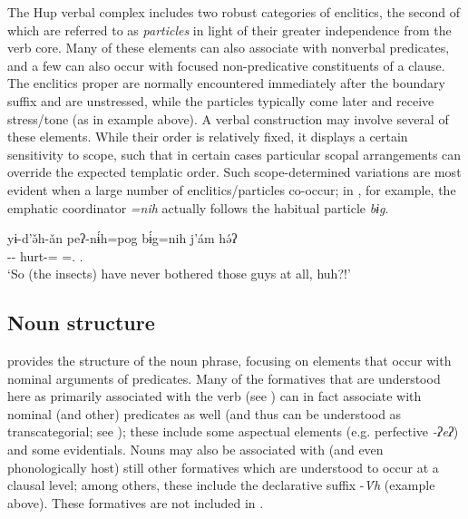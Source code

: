 \documentclass[output=paper]{langscibook}
\begin{document}
The Hup verbal complex includes two robust categories of enclitics, the second of which are referred to as \textit{particles} in light of their greater independence from the verb core. Many of these elements can also associate with nonverbal predicates, and a few can also occur with focused non-predicative constituents of a clause. The enclitics proper are normally encountered immediately after the boundary suffix and are unstressed, while the particles typically come later and receive stress/tone (as in example  above). A verbal construction may involve several of these elements. While their order is relatively fixed, it displays a certain sensitivity to scope, such that in certain cases particular scopal arrangements can override the expected templatic order. Such scope-determined variations are most evident when a large number of enclitics/particles co-occur; in , for example, the emphatic coordinator \textit{=nih} actually follows the habitual particle \textit{bɨg}.

\ea\label{ex:hup:key:9} 
\gll yɨ-d'ǝ̌h-ǎn peʔ-nɨ́h=pog bɨ́g=nih j'ám hǝ́ʔ\\ 
\Dem-\Pl-\Obj{} hurt-\Neg{}=\Emph{} \Hab=\Emph.\Co{} \Dst.\Cntr{} \Tag{} \\ 
\glt `So (the insects) have never bothered those guys at all, huh?!'
\z 


\subsection{Noun structure} 
\label{sec:hup:key:3.2}

 provides the structure of the noun phrase, focusing on elements that occur with nominal arguments of predicates. Many of the formatives that are understood here as primarily associated with the verb (see ) can in fact associate with nominal (and other) predicates as well (and thus can be understood as transcategorial; see ); these include some aspectual elements (e.g. perfective \textit{{}-ʔeʔ}) and some evidentials. Nouns may also be associated with (and even phonologically host) still other formatives which are understood to occur at a clausal level; among others, these include the declarative suffix -\textit{\'{V}h} (example  above). These formatives are not included in .
\end{document}
